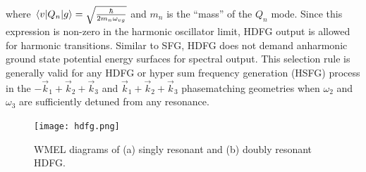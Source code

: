 \documentclass[aip, jcp, reprint, onecolumn]{revtex4-2}
\begin{document}
where $\mel{v}{Q_n}{g} = \sqrt{\frac{\hbar}{2m_n\omega_{vg}}}$ and $m_n$ is the ``mass'' of the $Q_n$ mode.  \cite{RN230}
Since this expression is non-zero in the harmonic oscillator limit, HDFG output is allowed for harmonic transitions. 
Similar to SFG, HDFG does not demand anharmonic ground state potential energy surfaces for spectral output. \cite{Shen94, Cho2000}
This selection rule is generally valid for any HDFG or hyper sum frequency generation (HSFG) process in the $-\vec{k}_1 + \vec{k}_2  + \vec{k}_3$ and $\vec{k}_1 + \vec{k}_2  + \vec{k}_3$ phasematching geometries when $\omega_2$ and $\omega_3$ are sufficiently detuned from any resonance.

\begin{figure}[!htbp]
	\centering
	\texttt{[image: hdfg.png]}
	\caption{WMEL diagrams of (a) singly resonant and (b) doubly resonant HDFG. 
	}
	\label{fig:hdfg}
\end{figure}
\end{document}
